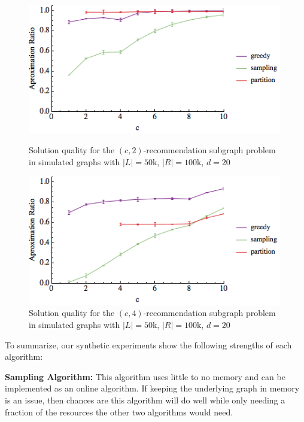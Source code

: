 \begin{figure}[t]
\centering
\begin{minipage}[h]{0.48\textwidth}
\centering
\includegraphics[width=0.99\textwidth]{images/l=50000,r=100000,a=2_Greedy_vs_Naive_error.png}
\vspace{-1cm}
\caption{Solution quality for the $(c, 2)$-recommendation subgraph problem in simulated graphs with $|L|=50$k, $|R|=100$k, $d=20$}\label{fig:a=2}
\end{minipage}
\vspace{.2cm}
\hspace{0cm}
\begin{minipage}[h]{0.48\textwidth}
\centering
\includegraphics[width=0.99\textwidth]{images/l=50000,r=100000,a=4_Greedy_vs_Naive_error.png}
\vspace{-1cm}
\caption{Solution quality for the $(c, 4)$-recommendation subgraph problem in simulated graphs with $|L|=50$k, $|R|=100$k, $d=20$}\label{fig:a=4}
\end{minipage}
\end{figure}

\vs
To summarize, our synthetic experiments show the following strengths of each algorithm: \vs

\textbf{Sampling Algorithm:} This algorithm uses little to no memory and can
be implemented as an online algorithm. If keeping the underlying graph in
memory is an issue, then chances are this algorithm will do well while only needing
a fraction of the resources the other two algorithms would need. \vs

